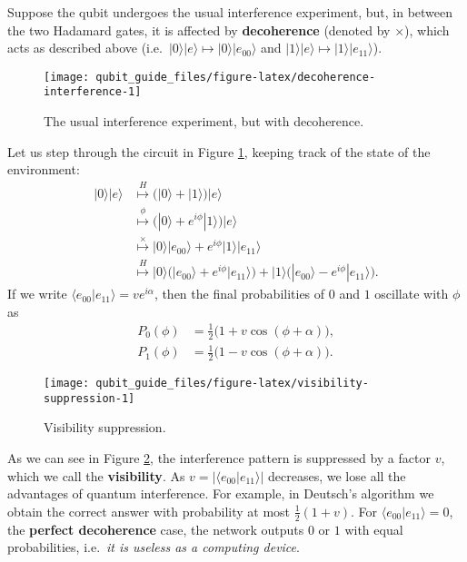 \documentclass[fleqn]{article}
\begin{document}
Suppose the qubit undergoes the usual interference experiment, but, in between the two Hadamard gates, it is affected by \textbf{decoherence} (denoted by \(\times\)), which acts as described above (i.e.~\(|0\rangle|e\rangle\mapsto|0\rangle|e_{00}\rangle\) and \(|1\rangle|e\rangle\mapsto|1\rangle|e_{11}\rangle\)).

\begin{figure}[H]

{\centering \texttt{[image: qubit\_guide\_files/figure-latex/decoherence-interference-1]} 

}

\caption{The usual interference experiment, but with decoherence.}\label{fig:decoherence-interference}
\end{figure}

Let us step through the circuit in Figure \ref{fig:decoherence-interference}, keeping track of the state of the environment:
\[
  \begin{aligned}
    |0\rangle|e\rangle
    & \overset{H}{\longmapsto} \Big( |0\rangle + |1\rangle \Big) |e\rangle
  \\& \overset{\phi}{\longmapsto} \Big( |0\rangle + e^{i\phi}|1\rangle \Big) |e\rangle
  \\& \overset{\times}{\longmapsto} |0\rangle|e_{00}\rangle + e^{i\phi}|1\rangle|e_{11}\rangle
  \\& \overset{H}{\longmapsto} |0\rangle\Big( |e_{00}\rangle + e^{i\phi}|e_{11}\rangle \Big) + |1\rangle\Big( |e_{00}\rangle - e^{i\phi}|e_{11}\rangle \Big).
  \end{aligned}
\]
If we write \(\langle e_{00}|e_{11}\rangle = ve^{i\alpha}\), then the final probabilities of \(0\) and \(1\) oscillate with \(\phi\) as
\[
  \begin{aligned}
    P_{0}(\phi) &= \frac12\big(1 + v\cos(\phi + \alpha)\big),
  \\P_{1}(\phi) &= \frac12\big(1 - v\cos(\phi + \alpha)\big).
  \end{aligned}
\]

\begin{figure}[H]

{\centering \texttt{[image: qubit\_guide\_files/figure-latex/visibility-suppression-1]} 

}

\caption{Visibility suppression.}\label{fig:visibility-suppression}
\end{figure}

As we can see in Figure \ref{fig:visibility-suppression}, the interference pattern is suppressed by a factor \(v\), which we call the \textbf{visibility}.
As \(v=|\langle e_{00}|e_{11}\rangle|\) decreases, we lose all the advantages of quantum interference.
For example, in Deutsch's algorithm we obtain the correct answer with probability at most \(\frac12(1+v)\).
For \(\langle e_{00}|e_{11}\rangle = 0\), the \textbf{perfect decoherence} case, the network outputs \(0\) or \(1\) with equal probabilities, i.e.~\emph{it is useless as a computing device}.
\end{document}
